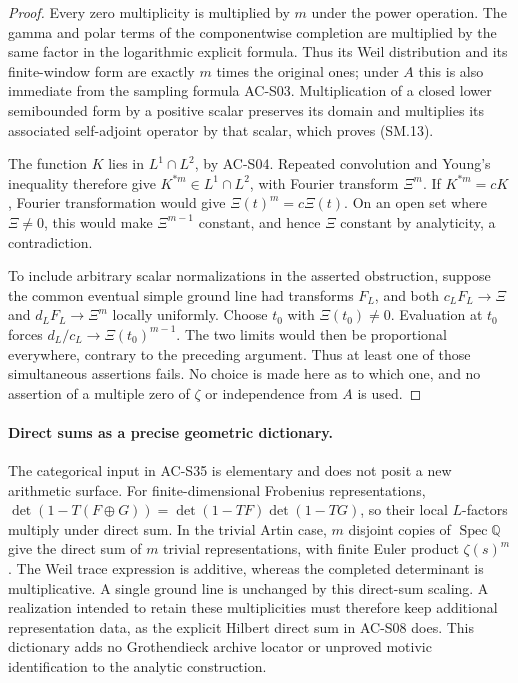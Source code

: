 \begin{proof}
Every zero multiplicity is multiplied by $m$ under
the power operation.  The gamma and polar terms
of the componentwise completion are multiplied
by the same factor in the logarithmic explicit
formula.  Thus its Weil distribution and its
finite-window form are exactly $m$ times the
original ones; under $A$ this is also immediate
from the sampling formula AC-S03.
Multiplication of a closed lower semibounded form
by a positive scalar preserves its domain and
multiplies its associated self-adjoint operator
by that scalar, which proves (SM.13).

The function $K$ lies in $L^1\cap L^2$, by
AC-S04.  Repeated convolution and Young's
inequality therefore give $K^{*m}\in L^1\cap L^2$,
with Fourier transform $\Xi^m$.
If $K^{*m}=cK$, Fourier transformation would give
$\Xi(t)^m=c\Xi(t)$.
On an open set where $\Xi\ne0$, this would make
$\Xi^{m-1}$ constant, and hence $\Xi$ constant
by analyticity, a contradiction.

To include arbitrary scalar normalizations in the
asserted obstruction, suppose the common eventual
simple ground line had transforms $F_L$, and both
$c_LF_L\to\Xi$ and $d_LF_L\to\Xi^m$ locally uniformly.
Choose $t_0$ with $\Xi(t_0)\ne0$.
Evaluation at $t_0$ forces
$d_L/c_L\to\Xi(t_0)^{m-1}$.
The two limits would then be proportional everywhere,
contrary to the preceding argument.
Thus at least one of those simultaneous assertions
fails.  No choice is made here as to which one,
and no assertion of a multiple zero of $\zeta$
or independence from $A$ is used.
\end{proof}

\paragraph{Direct sums as a precise geometric dictionary.}
The categorical input in AC-S35 is elementary and
does not posit a new arithmetic surface.
For finite-dimensional Frobenius representations,
$\det(1-T(F\oplus G))=\det(1-TF)\det(1-TG)$,
so their local $L$-factors multiply under direct sum.
In the trivial Artin case, $m$ disjoint copies of
$\operatorname{Spec}\mathbb Q$ give the direct sum
of $m$ trivial representations, with finite Euler
product $\zeta(s)^m$.
The Weil trace expression is additive, whereas
the completed determinant is multiplicative.
A single ground line is unchanged by this direct-sum
scaling.  A realization intended to retain these
multiplicities must therefore keep additional
representation data, as the explicit Hilbert direct
sum in AC-S08 does.  This dictionary adds no
Grothendieck archive locator or unproved motivic
identification to the analytic construction.
